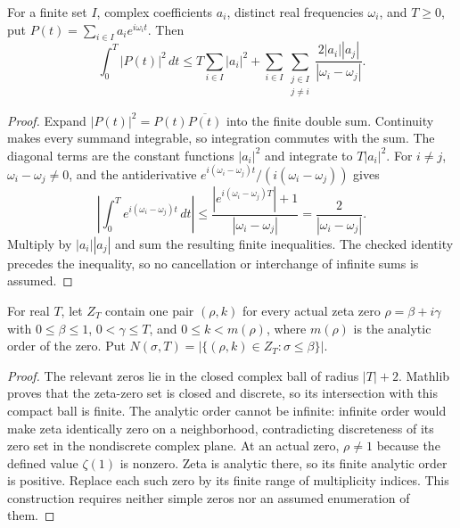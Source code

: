 \begin{lemma}
\label{construction:dirichlet-mean-square}
\leanok
For a finite set $I$, complex coefficients $a_i$, distinct real frequencies
$\omega_i$, and $T\ge0$, put $P(t)=\sum_{i\in I}a_i e^{i\omega_i t}$.
Then
\[
 \int_0^T|P(t)|^2\,dt\le T\sum_{i\in I}|a_i|^2+
 \sum_{i\in I}\sum_{\substack{j\in I\\j\ne i}}
       \frac{2|a_i||a_j|}{|\omega_i-\omega_j|}.
\]
\end{lemma}
\begin{proof}
Expand $|P(t)|^2=P(t)\overline{P(t)}$ into the finite double sum.
Continuity makes every summand integrable, so integration commutes with
the sum. The diagonal terms are the constant functions $|a_i|^2$ and
integrate to $T|a_i|^2$. For $i\ne j$,
$\omega_i-\omega_j\ne0$, and the antiderivative
$e^{i(\omega_i-\omega_j)t}/(i(\omega_i-\omega_j))$ gives
\[
 \left|\int_0^T e^{i(\omega_i-\omega_j)t}\,dt\right|
 \le\frac{|e^{i(\omega_i-\omega_j)T}|+1}{|\omega_i-\omega_j|}
 =\frac2{|\omega_i-\omega_j|}.
\]
Multiply by $|a_i||a_j|$ and sum the resulting finite inequalities.
The checked identity precedes the inequality, so no cancellation or
interchange of infinite sums is assumed.
\end{proof}

\begin{definition}
\label{construction:zero-count}
\leanok
For real $T$, let $Z_T$ contain one pair $(\rho,k)$ for every actual
zeta zero $\rho=\beta+i\gamma$ with $0\le\beta\le1$,
$0<\gamma\le T$, and $0\le k<m(\rho)$, where $m(\rho)$ is the
analytic order of the zero.  Put
$N(\sigma,T)=|\{(\rho,k)\in Z_T:\sigma\le\beta\}|$.
\end{definition}
\begin{proof}
The relevant zeros lie in the closed complex ball of radius $|T|+2$.
Mathlib proves that the zeta-zero set is closed and discrete, so its
intersection with this compact ball is finite.
The analytic order cannot be infinite: infinite order would make zeta
identically zero on a neighborhood, contradicting discreteness of its
zero set in the nondiscrete complex plane.
At an actual zero, $\rho\ne1$ because the defined value $\zeta(1)$ is
nonzero.  Zeta is analytic there, so its finite analytic order is
positive.  Replace each such zero by its finite range of multiplicity
indices.  This construction requires neither simple zeros nor an
assumed enumeration of them.
\end{proof}

